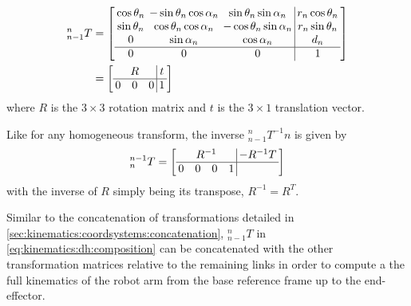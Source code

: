 \begin{eqnarray}
_{n-1}^nT&=
\left[ \arraycolsep=2pt%
\begin{array}{ccc|c}
\cos \theta_n & -\sin \theta_n \cos\alpha_n & \sin\theta_n \sin\alpha_n & r_n \cos\theta_n\\
\sin \theta_n & \cos\theta_n \cos\alpha_n & -\cos\theta_n\sin\alpha_n & r_n \sin\theta_n\\
0 & \sin\alpha_n & \cos\alpha_n & d_n \nonumber \\
\hline
0 & 0 & 0 & 1
\end{array}
\right]\\
&=
\left[ \arraycolsep=2pt%
\begin{array}{c|c}
R & t\\
\hline
0 \quad 0 \quad 0 & 1
\end{array}
\right]
\end{eqnarray}
where $R$ is the $3\times3$ rotation matrix and $t$ is the $3\times1$ translation vector.

Like for any homogeneous transform, the inverse $_{n-1}^nT^{-1}n$ is given by
\begin{equation}
^{n-1}_nT=\left[ \arraycolsep=2pt%
\begin{array}{c|c}
R^{-1} & -R^{-1}T\\
\hline
0 \quad 0 \quad 0 \quad 1
\end{array}
\right]
\end{equation}
with the inverse of $R$ simply being its transpose, $R^{-1}=R^T$.

Similar to the concatenation of transformations detailed in \cref{sec:kinematics:coordsystems:concatenation}, $_{n-1}^nT$ in \cref{eq:kinematics:dh:composition} can be concatenated with the other transformation matrices relative to the remaining links in order to compute a the full kinematics of the robot arm from the base reference frame up to the end-effector.

